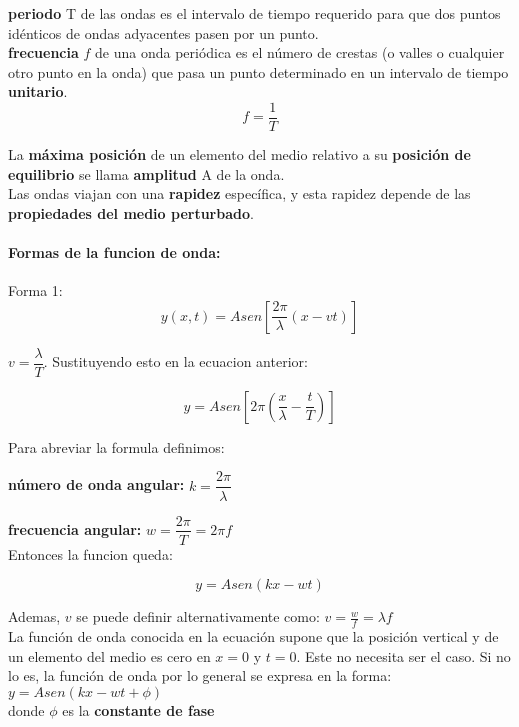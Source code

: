 \documentclass[10pt]{article}
\begin{document}
\textbf{periodo} T de las ondas es el intervalo de tiempo requerido 
para que dos puntos idénticos de ondas adyacentes pasen por un punto.\\

\textbf{frecuencia} $f$ de una onda periódica es el número de crestas (o
valles o cualquier otro punto en la onda) que pasa un punto determinado en un intervalo
de tiempo \textbf{unitario}.\\

\begin{equation*}
    f = \dfrac{1}{T}
\end{equation*}

La \textbf{máxima posición} de un elemento del medio relativo a su \textbf{posición de equilibrio} se
llama \textbf{amplitud} A de la onda.\\

Las ondas viajan con una \textbf{rapidez} específica, y esta rapidez depende de las \textbf{propiedades
del medio perturbado}.\\

\paragraph{Formas de la funcion de onda:}
Forma 1:
\begin{equation*}
    y(x, t) =  A sen \left[ \frac{2\pi}{\lambda} (x-vt) \right] 
\end{equation*}

$v = \dfrac{\lambda}{T}$. Sustituyendo esto en la ecuacion anterior:

\begin{equation*}
    y = Asen \left[ 2\pi \left( \frac{x}{\lambda} - \frac{t}{T} \right) \right] 
\end{equation*}

Para abreviar la formula definimos:\\
\linebreak

\textbf{número de onda angular: }$k = \dfrac{2\pi}{\lambda}$

\textbf{frecuencia angular: }$w = \dfrac{2\pi}{T} = 2\pi f$\\
\linebreak
Entonces la funcion queda:

\begin{equation*}
    y = Asen(kx-wt)
\end{equation*}

Ademas, $v$ se puede definir alternativamente como: $v = \frac{w}{f} = \lambda f$\\
\linebreak
La función de onda conocida en la ecuación supone que la posición vertical y de
un elemento del medio es cero en $x=0$ y $t=0$. Este no necesita ser el caso. Si no lo es, la
función de onda por lo general se expresa en la forma:\\
$y = Asen(kx-wt + \phi)$\\
donde $\phi$ es la \textbf{constante de fase}
\end{document}
